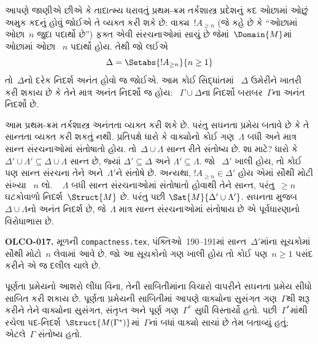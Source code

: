 %
\begin{ex}
આપણે જાણીએ છીએ કે તાદાત્મ્ય ધરાવતું પ્રથમ-ક્રમ તર્કશાસ્ત્ર
પ્રદેશનું કદ ઓછામાં ઓછું અમુક કદનું હોવું જોઈએ તે વ્યક્ત કરી શકે
છે: વાક્ય~$!A_{\ge n}$ (જે કહે છે કે ``ઓછામાં ઓછા~$n$ જુદા પદાર્થો
છે'') ફક્ત એવી સંરચનાઓમાં સાચું છે જેમાં~$\Domain{M}$માં ઓછામાં ઓછા
~$n$ પદાર્થો હોય. તેથી જો લઈએ
  \[
  \Delta = \Setabs{!A_{\ge n}}{n \ge 1}
  \]
તો~$\Delta$નો દરેક નિદર્શ અનંત હોવો જ જોઈએ. આમ કોઈ સિદ્ધાંતમાં
~$\Delta$ ઉમેરીને ખાતરી કરી શકાય છે કે તેને માત્ર અનંત નિદર્શો જ હોય:
~$\Gamma\cup\Delta$ના નિદર્શો બરાબર~$\Gamma$ના અનંત નિદર્શો છે.

આમ પ્રથમ-ક્રમ તર્કશાસ્ત્ર અનંતતા વ્યક્ત કરી શકે છે. પરંતુ સઘનતા પ્રમેય
બતાવે છે કે તે સાન્તતા વ્યક્ત કરી શકતું નથી. પ્રતિપક્ષે ધારો કે
વાક્યોનો કોઈ ગણ~$\Lambda$ બધી અને માત્ર સાન્ત સંરચનાઓમાં
સંતોષાતો હોય. તો~$\Delta\cup\Lambda$ સાન્ત રીતે સંતોષ્ય છે. શા માટે?
ધારો કે $\Delta'\cup\Lambda'\subseteq\Delta\cup\Lambda$ સાન્ત છે,
જ્યાં $\Delta'\subseteq\Delta$ અને $\Lambda'\subseteq\Lambda$. જો
~$\Delta'$ ખાલી હોય, તો કોઈ પણ સાન્ત સંરચના તેને અને~$\Lambda'$ને
સંતોષે છે. અન્યથા, $!A_{\ge n}\in\Delta'$ હોય એમાં સૌથી મોટી સંખ્યા
~$n$ લો. ~ $\Lambda$ બધી સાન્ત સંરચનાઓમાં સંતોષાતો હોવાથી તેને સાન્ત,
પરંતુ~$\ge n$ ઘટકોવાળો નિદર્શ~$\Struct{M}$ છે. પરંતુ
પછી $\Sat{M}{\Delta'\cup\Lambda'}$. સઘનતા મુજબ
~$\Delta\cup\Lambda$નો અનંત નિદર્શ છે, જે~$\Lambda$ માત્ર સાન્ત
સંરચનાઓમાં સંતોષાય છે એ પૂર્વધારણાનો વિરોધાભાસ છે.
\end{ex}


\begin{editorial}
\textbf{OLCO-017.} મૂળની \texttt{compactness.tex}, પંક્તિઓ~190--191માં સાન્ત~$\Delta'$માંના સૂચકોમાં સૌથી મોટો~$n$ લેવામાં આવે છે. જો આ સૂચકોનો ગણ ખાલી હોય તો કોઈ પણ~$n\ge1$ પસંદ કરીને એ જ દલીલ ચાલે છે.
\end{editorial}
\endgroup


\begingroup
\makeatletter{}\makeatother


\label{guunit:OLP-0136}


પૂર્ણતા પ્રમેયનો આશરો લીધા વિના, તેની સાબિતીમાંના વિચારો વાપરીને
સઘનતા પ્રમેય સીધો સાબિત કરી શકાય છે. પૂર્ણતા પ્રમેયની સાબિતીમાં આપણે
વાક્યોના સુસંગત ગણ~$\Gamma$થી શરૂ કરીને તેને વાક્યોના
સુસંગત, સંતૃપ્ત અને પૂર્ણ ગણ~$\Gamma^*$ સુધી
વિસ્તાર્યો હતો. પછી~$\Gamma^*$માંથી રચેલા
પદ-નિદર્શ~$\Struct{M(\Gamma^*)}$માં~$\Gamma$નાં બધાં વાક્યો સાચાં છે
તેમ બતાવ્યું હતું; એટલે~$\Gamma$ સંતોષ્ય હતો.

